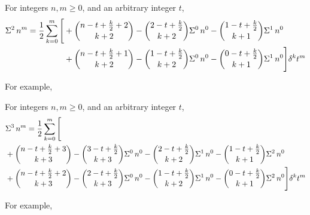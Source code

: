 \begin{proposition}
  \label{prop:double-sums-of-powers-decomposition}
  For integers $n,m \geq 0$, and an arbitrary integer $t$,
  \begin{align*}
    \Sigma^{2}\,{n}^{m} = \frac{1}{2} \sum_{k=0}^{m}
    \Bigg[
      &+ \binom{n -t + \frac{k}{2} +2}{k+2} - \binom{2 -t + \tfrac{k}{2}}{k+2} \Sigma^{0}\,{n}^{0} - \binom{1 -t + \tfrac{k}{2}}{k+1} \Sigma^{1}\,{n}^{0} \\
      &+ \binom{n -t + \frac{k}{2}+1}{k+2} - \binom{1-t + \tfrac{k}{2}}{k+2} \Sigma^{0}\,{n}^{0} - \binom{0-t + \tfrac{k}{2}}{k+1} \Sigma^{1}\,{n}^{0}
    \Bigg] \delta^{k} t^m
  \end{align*}
\end{proposition}
For example,


\begin{proposition}
  \label{prop:triple-sums-of-powers-decomposition}
  For integers $n,m \geq 0$, and an arbitrary integer $t$,
  \begin{align*}
    &\Sigma^{3}\,{n}^{m}
    = \frac{1}{2} \sum_{k=0}^{m}
    \Bigg[ \\
      &+ \binom{n -t + \frac{k}{2} +3}{k+3} - \binom{3 -t + \tfrac{k}{2}}{k+3} \Sigma^{0}\,{n}^{0} - \binom{2 -t + \tfrac{k}{2}}{k+2} \Sigma^{1}\,{n}^{0} - \binom{1 -t + \tfrac{k}{2}}{k+1} \Sigma^{2}\,{n}^{0} \\
      &+ \binom{n -t + \frac{k}{2}+2}{k+3} - \binom{2-t + \tfrac{k}{2}}{k+3} \Sigma^{0}\,{n}^{0} - \binom{1-t + \tfrac{k}{2}}{k+2} \Sigma^{1}\,{n}^{0} - \binom{0-t + \tfrac{k}{2}}{k+1} \Sigma^{2}\,{n}^{0}
    \Bigg] \delta^{k} t^m
  \end{align*}
\end{proposition}
For example,

